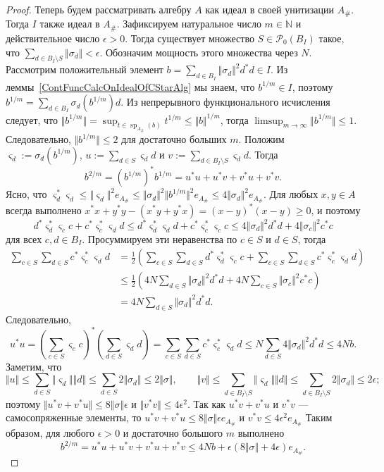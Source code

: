 \begin{proof}
Теперь будем рассматривать алгебру $A$ как идеал в своей унитизации $A_\#$.
Тогда $I$ также идеал в $A_\#$. Зафиксируем натуральное число $m\in\mathbb{N}$ и
действительное число $\epsilon>0$. Тогда существует множество
$S\in\mathcal{P}_0(B_I)$ такое, что $\sum_{d\in B_I\setminus
S}\Vert\sigma_d\Vert<\epsilon$. Обозначим мощность этого множества через $N$.
Рассмотрим положительный элемент 
$b=\sum_{d\in B_I}\Vert\sigma_d\Vert^2 d^*d\in I$. 
Из леммы~\ref{ContFuncCalcOnIdealOfCStarAlg} мы знаем, что $b^{1/m}\in I$,
поэтому $b^{1/m}=\sum_{d\in B_I}\sigma_d(b^{1/m})d$. Из непрерывного
функционального исчисления следует, что $\Vert
b^{1/m}\Vert=\sup_{t\in\operatorname{sp}_{A_\#}(b)} t^{1/m}\leq\Vert
b\Vert^{1/m}$, тогда $\limsup_{m\to\infty}\Vert b^{1/m}\Vert\leq 1$.
Следовательно, $\Vert b^{1/m}\Vert\leq 2$ для достаточно больших $m$. Положим
$\varsigma_d:=\sigma_d(b^{1/m})$, $u:=\sum_{d\in S}\varsigma_d d$ и
$v:=\sum_{d\in B_I\setminus S}\varsigma_d d$. Тогда 
$$
b^{2/m}={(b^{1/m})}^*b^{1/m}=u^*u+u^*v+v^*u+v^*v.
$$
Ясно, что 
$\varsigma_d^*\varsigma_d\leq \Vert \varsigma_d\Vert^2 e_{A_\#}
\leq \Vert \sigma_d\Vert^2\Vert b^{1/m}\Vert^2 e_{A_\#}
\leq 4\Vert \sigma_d\Vert^2 e_{A_\#}$. Для любых $x,y \in A$ всегда выполнено
$x^*x+y^*y-(x^*y+y^*x)={(x-y)}^*(x-y)\geq 0$, и поэтому 
$$
d^*\varsigma_d^* \varsigma_c c+c^*\varsigma_c^* \varsigma_d d
\leq d^*\varsigma_d^*\varsigma_d d + c^*\varsigma_c^*\varsigma_c c
\leq 4\Vert \sigma_d\Vert^2 d^*d+4\Vert \sigma_c\Vert^2 c^*c
$$
для всех $c,d\in B_I$. Просуммируем эти неравенства по $c\in S$ и $d\in S$,
тогда
$$
\begin{aligned}
\sum_{c\in S}\sum_{d\in S}c^*\varsigma_c^* \varsigma_d d
&=\frac{1}{2}\left(\sum_{c\in S}\sum_{d\in S}d^*\varsigma_d^* \varsigma_c c
+\sum_{c\in S}\sum_{d\in S}c^*\varsigma_c^* \varsigma_d d\right)\\
&\leq\frac{1}{2}\left(4 N\sum_{d\in S} \Vert \sigma_d\Vert^2 d^*d+
4 N\sum_{c\in S} \Vert \sigma_c\Vert^2 c^*c\right)\\
&=4 N\sum_{d\in S} \Vert \sigma_d\Vert^2 d^*d.
\end{aligned}
$$
Следовательно,
$$
u^*u
={\left(\sum_{c\in S}\varsigma_c c\right)}^*
\left(\sum_{d\in S}\varsigma_d d\right)
=\sum_{c\in S}\sum_{d\in S}c^*\varsigma_c^* \varsigma_d d
\leq N\sum_{d\in S} 4\Vert \sigma_d\Vert^2 d^*d
\leq 4N b.
$$
Заметим, что
$$
\Vert u\Vert
\leq \sum_{d\in S}\Vert\varsigma_d\Vert\Vert d\Vert
\leq \sum_{d\in S}2\Vert\sigma_d\Vert
\leq 2\Vert\sigma\Vert,
\qquad
\Vert v\Vert
\leq \sum_{d\in B_I\setminus S}\Vert\varsigma_d\Vert\Vert d\Vert
\leq \sum_{d\in B_I\setminus S}2\Vert\sigma_d\Vert
\leq 2\epsilon;
$$
поэтому $\Vert u^*v+v^*u\Vert\leq 8\Vert\sigma\Vert\epsilon$ и $\Vert
v^*v\Vert\leq 4\epsilon^2$. Так как $u^*v+v^*u$ и $v^*v$ ---  самосопряженные
элементы, то $u^*v+v^*u\leq 8\Vert\sigma\Vert\epsilon e_{A_\#}$ и $v^*v\leq
4\epsilon^2 e_{A_\#}$ Таким образом, для любого $\epsilon>0$ и достаточно
большого $m$ выполнено 
$$
b^{2/m}
=u^*u+u^*v+v^*u+v^*v
\leq 4Nb+\epsilon(8\Vert\sigma\Vert+4\epsilon)e_{A_\#}.
$$


\end{proof}
